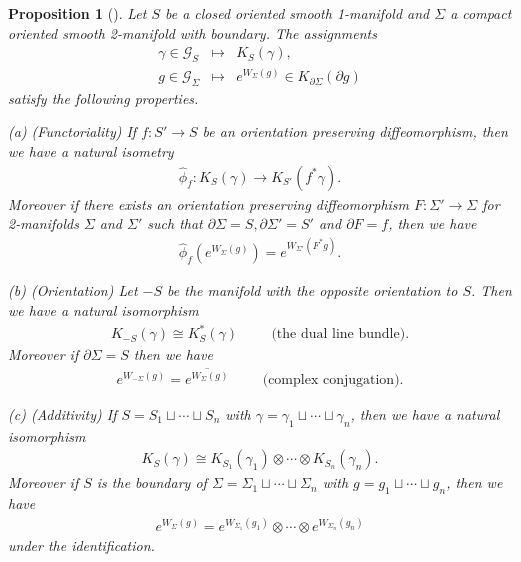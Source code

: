 \documentclass[a4paper,a4paper]{article}
\newtheorem{prop}[thm]{Proposition}
\theoremstyle{definition}
\theoremstyle{remark}
\newcommand{\G}{\mathcal{G}}
\def\h#1{ \widehat{#1} }
\begin{document}
\begin{prop}[\cite{F1}] \label{thm_axioms_WZ}
Let $S$ be a closed oriented smooth 1-manifold and $\Sigma$ a compact oriented smooth 2-manifold with boundary. The assignments
\begin{eqnarray*}
\gamma \in \G_S & \longmapsto & K_S(\gamma) , \\
g \in \G_\Sigma & \longmapsto & e^{ W_\Sigma(g) } 
\in K_{\partial \Sigma}(\partial g)
\end{eqnarray*}
satisfy the following properties.

(a) (Functoriality) If $f : S' \to S$ be an orientation preserving diffeomorphism, then we have a natural isometry
\begin{eqnarray}
\h{\phi}_f : K_S(\gamma) \to K_{S'}(f^*\gamma) .
\end{eqnarray}
Moreover if there exists an orientation preserving diffeomorphism $F : \Sigma' \to \Sigma$ for 2-manifolds $\Sigma$ and $\Sigma'$ such that $\partial \Sigma = S, \partial \Sigma' = S'$ and $\partial F = f$, then we have
\begin{eqnarray}
\h{\phi}_f \left( e^{ W_\Sigma(g) } \right) = e^{ W_{\Sigma'}(F^*g) } .
\end{eqnarray}

(b) (Orientation) Let $-S$ be the manifold with the opposite orientation to $S$. Then we have a natural isomorphism
\begin{eqnarray}
K_{-S}(\gamma) \cong K_{S}^*(\gamma)
\hspace{1cm} \textrm{(the dual line bundle)}.
\end{eqnarray}
Moreover if $\partial \Sigma = S$ then we have
\begin{eqnarray}
e^{ W_{-\Sigma}(g) }  = \overline{ e^{ W_\Sigma(g) } }
\hspace{1cm} \textrm{(complex conjugation)}.
\end{eqnarray}

(c) (Additivity) If $S = S_1 \sqcup \cdots \sqcup S_n$ with $\gamma = \gamma_1 \sqcup \cdots \sqcup \gamma_n$, then we have a natural isomorphism
\begin{eqnarray}
K_S(\gamma) \cong 
K_{S_1}(\gamma_1) \otimes \cdots \otimes K_{S_n}(\gamma_n).
\end{eqnarray}
Moreover if $S$ is the boundary of $\Sigma = \Sigma_1 \sqcup \cdots \sqcup \Sigma_n$ with $g = g_1 \sqcup \cdots \sqcup g_n$, then we have
\begin{eqnarray}
e^{ W_\Sigma(g) } = 
e^{ W_{\Sigma_1}(g_1) } \otimes \cdots \otimes e^{ W_{\Sigma_n}(g_n) }
\end{eqnarray}
under the identification.


\end{prop}
\end{document}
